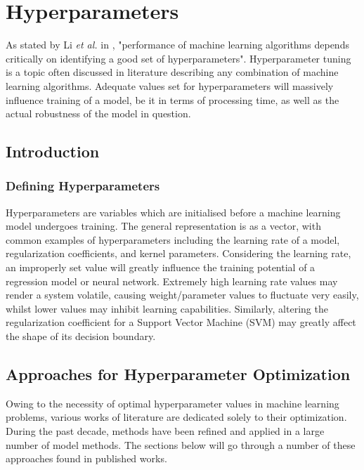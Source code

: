 \chapter[Hyperparameters]{Hyperparameters}
\label{ch:Hyperparameters}

As stated by Li \textit{et al.} in \cite{Li2017}, "performance of machine learning algorithms depends critically on identifying a good set of hyperparameters". Hyperparameter tuning is a topic often discussed in literature describing any combination of machine learning algorithms. Adequate values set for hyperparameters will massively influence training of a model, be it in terms of processing time, as well as the actual robustness of the model in question. 

\section{Introduction}\label{sec:page-layout}
\subsection{Defining Hyperparameters}\label{sec:headings}
Hyperparameters are variables which are initialised before a machine learning model undergoes training. The general representation is as a vector, with common examples of hyperparameters including the learning rate of a model, regularization coefficients, and kernel parameters. Considering the learning rate, an improperly set value will greatly influence the training potential of a regression model or neural network. Extremely high learning rate values may render a system volatile, causing weight/parameter values to fluctuate very easily, whilst lower values may inhibit learning capabilities. Similarly, altering the regularization coefficient for a Support Vector Machine (SVM) may greatly affect the shape of its decision boundary.


\section{Approaches for Hyperparameter Optimization}
Owing to the necessity of optimal hyperparameter values in machine learning problems, various works of literature are dedicated solely to their optimization. During the past decade, methods have been refined and applied in a large number of model methods. The sections below will go through a number of these approaches found in published works.
